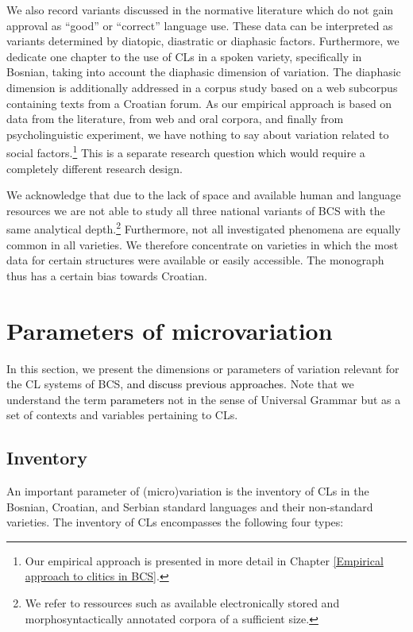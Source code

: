 We also record variants discussed in the normative literature which do not gain approval as ``good'' or ``correct'' language use. These data can be interpreted as variants determined by diatopic, diastratic or diaphasic factors. Furthermore, we dedicate one chapter to the use of CLs in a spoken variety, specifically in Bosnian, taking into account the diaphasic dimension of variation. The diaphasic dimension is additionally addressed in a corpus study based on a web subcorpus containing texts from a Croatian forum. As our empirical approach is based on data from the literature, from web and oral corpora, and finally from psycholinguistic experiment, we have nothing to say about variation related to social factors.\footnote{Our empirical approach is presented in more detail in Chapter \ref{Empirical approach to clitics in BCS}.} This is a separate research question which would require a completely different research design. 

We acknowledge that due to the lack of space and available human and language resources we are not able to study all three national variants of BCS with the same analytical depth.\footnote{We refer to ressources such as available electronically stored and morphosyntactically annotated corpora of a sufficient size.} Furthermore, not all investigated phenomena are equally common in all varieties. We therefore concentrate on varieties in which the most data for certain structures were available or easily accessible. The monograph thus has a certain bias towards Croatian. 

\section{Parameters of microvariation}
\label{Parameters of microvariation}
In this section, we present the dimensions or parameters of variation relevant for the CL systems of BCS, \textcolor{black}{and discuss previous approaches}. Note that we understand the term \textcolor{black}{parameters} not in the sense of Universal Grammar but as a set of contexts and variables pertaining to CLs.

\subsection{Inventory}

An important parameter of (micro)variation is the inventory of CLs in the Bosnian, Croatian, and Serbian standard languages and their non-standard varieties. The inventory of CLs encompasses the following four types:

